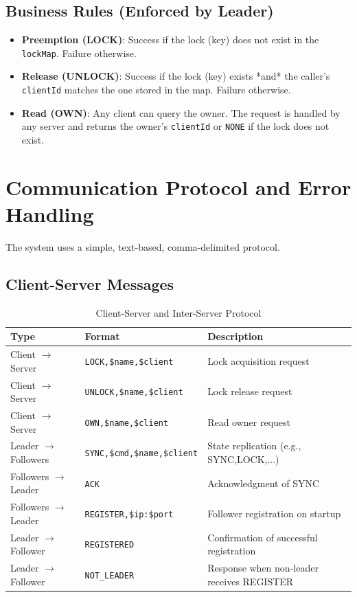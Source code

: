 \documentclass[a4paper,11pt]{article}
\begin{document}
\subsection*{Business Rules (Enforced by Leader)}
\begin{itemize}
    \item \textbf{Preemption (LOCK)}: Success if the lock (key) does not exist in the \texttt{lockMap}. Failure otherwise.
    \item \textbf{Release (UNLOCK)}: Success if the lock (key) exists *and* the caller's \texttt{clientId} matches the one stored in the map. Failure otherwise.
    \item \textbf{Read (OWN)}: Any client can query the owner. The request is handled by any server and returns the owner's \texttt{clientId} or \texttt{NONE} if the lock does not exist.
\end{itemize}

\section{Communication Protocol and Error Handling}
The system uses a simple, text-based, comma-delimited protocol.

\subsection*{Client-Server Messages}
\begin{table}[htbp]
\centering
\caption{Client-Server and Inter-Server Protocol}
\label{tab:protocol}
\begin{tabular}{@{}lll@{}}
\toprule
\textbf{Type} & \textbf{Format} & \textbf{Description} \\
\midrule
Client $\rightarrow$ Server & \texttt{LOCK,\$name,\$client} & Lock acquisition request \\
Client $\rightarrow$ Server & \texttt{UNLOCK,\$name,\$client} & Lock release request \\
Client $\rightarrow$ Server & \texttt{OWN,\$name,\$client} & Read owner request \\
Leader $\rightarrow$ Followers & \texttt{SYNC,\$cmd,\$name,\$client} & State replication (e.g., SYNC,LOCK,...) \\
Followers $\rightarrow$ Leader & \texttt{ACK} & Acknowledgment of SYNC \\
Followers $\rightarrow$ Leader & \texttt{REGISTER,\$ip:\$port} & Follower registration on startup \\
Leader $\rightarrow$ Follower & \texttt{REGISTERED} & Confirmation of successful registration \\
Leader $\rightarrow$ Follower & \texttt{NOT\_LEADER} & Response when non-leader receives REGISTER \\
\bottomrule
\end{tabular}
\end{table}
\end{document}
